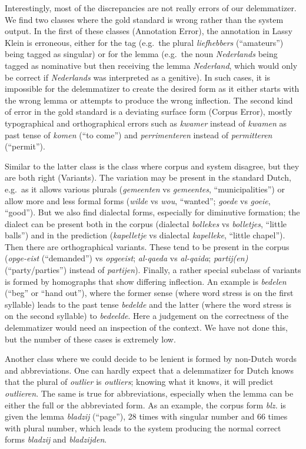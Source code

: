 \documentclass[a4paper,10pt,twoside]{article}
\begin{document}
Interestingly, most of the discrepancies are not really errors of our delemmatizer. We find two classes where the gold standard is wrong rather than the system output. In the first of these classes (Annotation Error), the annotation in Lassy Klein is erroneous, either for the tag (e.g.\ the plural \textit{liefhebbers} (``amateurs'') being tagged as singular) or for the lemma (e.g.\ the noun \textit{Nederlands} being tagged as nominative but then receiving the lemma \textit{Nederland}, which would only be correct if \textit{Nederlands} was interpreted as a genitive). In such cases, it is impossible for the delemmatizer to create the desired form as it either starts with the wrong lemma or attempts to produce the wrong inflection. The second kind of error in the gold standard is a deviating surface form (Corpus Error), mostly typographical and orthographical errors such as \textit{kwamer} instead of \textit{kwamen} as past tense of \textit{komen} (``to come'') and \textit{perrimenteren} instead of \textit{permitteren} (``permit''). 

Similar to the latter class is the class where corpus and system disagree, but they are both right (Variants). The variation may be present in the standard Dutch, e.g.\ as it allows various plurals (\textit{gemeenten} vs \textit{gemeentes}, ``municipalities'') or allow more and less formal forms (\textit{wilde} vs \textit{wou}, ``wanted''; \textit{goede} vs \textit{goeie}, ``good''). But we also find dialectal forms, especially for diminutive formation; the dialect can be present both in the corpus (dialectal \textit{bollekes} vs \textit{bolletjes}, ``little balls'') and in the prediction (\textit{kapelletje} vs dialectal \textit{kapelleke}, ``little chapel''). Then there are orthographical variants. These tend to be present in the corpus (\textit{opge-eist} (``demanded'') vs \textit{opgeeist}; \textit{al-qaeda} vs \textit{al-qaida}; \textit{partij(en)} (``party/parties'') instead of \textit{partijen}). Finally, a rather special subclass of variants is formed by homographs that show differing inflection. An example is \textit{bedelen} (``beg'' or ``hand out''), where the former sense (where word stress is on the first syllable) leads to the past tense \textit{bedelde} and the latter (where the word stress is on the second syllable) to \textit{bedeelde}. Here a judgement on the correctness of the delemmatizer would need an inspection of the context. We have not done this, but the number of these cases is extremely low.     

Another class where we could decide to be lenient is formed by non-Dutch words and abbreviations. One can hardly expect that a delemmatizer for Dutch knows that the plural of \textit{outlier} is \textit{outliers}; knowing what it knows, it will predict \textit{outlieren}. The same is true for abbreviations, especially when the lemma can be either the full or the abbreviated form. As an example, the corpus form \textit{blz.} is given the lemma \textit{bladzij} (``page''), 28 times with singular number and 66 times with plural number, which leads to the system producing the normal correct forms \textit{bladzij} and \textit{bladzijden}. 
\end{document}
